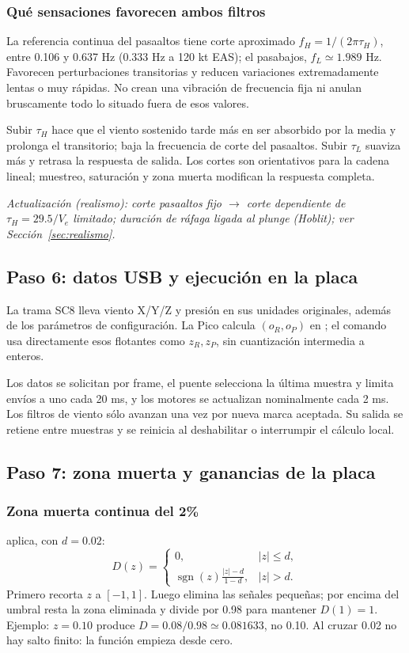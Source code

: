 \documentclass[11pt,a4paper]{article}
\newcommand{\code}[1]{\texttt{\detokenize{#1}}}
\begin{document}
\subsubsection{Qué sensaciones favorecen ambos filtros}
La referencia continua del pasaaltos tiene corte aproximado $f_H=1/(2\pi\tau_H)$, entre 0.106 y 0.637 Hz (0.333 Hz a 120 kt EAS); el pasabajos, $f_L\simeq1.989$ Hz. Favorecen perturbaciones transitorias y reducen variaciones extremadamente lentas o muy rápidas. No crean una vibración de frecuencia fija ni anulan bruscamente todo lo situado fuera de esos valores.

Subir $\tau_H$ hace que el viento sostenido tarde más en ser absorbido por la media y prolonga el transitorio; baja la frecuencia de corte del pasaaltos. Subir $\tau_L$ suaviza más y retrasa la respuesta de salida. Los cortes son orientativos para la cadena lineal; muestreo, saturación y zona muerta modifican la respuesta completa.

\textit{Actualización (realismo): corte pasaaltos fijo $\rightarrow$ corte dependiente de $\tau_H=29.5/V_e$ limitado; duración de ráfaga ligada al plunge (Hoblit); ver Sección~\ref{sec:realismo}.}

\subsection{Paso 6: datos USB y ejecución en la placa}
La trama SC8 lleva viento X/Y/Z y presión en sus unidades originales, además de los parámetros de configuración. La Pico calcula $(o_R,o_P)$ en \code{GustModel.h}; el comando usa directamente esos flotantes como $z_R,z_P$, sin cuantización intermedia a enteros.

Los datos se solicitan por frame, el puente selecciona la última muestra y limita envíos a uno cada 20 ms, y los motores se actualizan nominalmente cada 2 ms. Los filtros de viento sólo avanzan una vez por nueva marca aceptada. Su salida se retiene entre muestras y se reinicia al deshabilitar o interrumpir el cálculo local.

\subsection{Paso 7: zona muerta y ganancias de la placa}
\subsubsection{Zona muerta continua del 2\%}
\code{SimTelemetry.h::gustCommand} aplica, con $d=0.02$:
\begin{equation}
D(z)=\begin{cases}
0,&|z|\le d,\\[2pt]
\displaystyle\operatorname{sgn}(z)\frac{|z|-d}{1-d},&|z|>d.
\end{cases}
\label{eq:turb-dead}
\end{equation}
Primero recorta $z$ a $[-1,1]$. Luego elimina las señales pequeñas; por encima del umbral resta la zona eliminada y divide por 0.98 para mantener $D(1)=1$. Ejemplo: $z=0.10$ produce $D=0.08/0.98\simeq0.081633$, no 0.10. Al cruzar 0.02 no hay salto finito: la función empieza desde cero.
\end{document}
